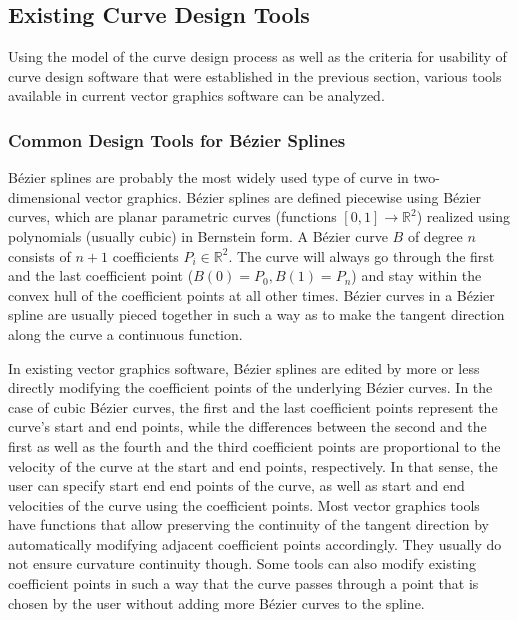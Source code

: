 \documentclass[a4paper]{article}
\begin{document}
		\subsection{Existing Curve Design Tools}

			Using the model of the curve design process as well as the criteria for usability of curve design software that were established in the previous section, various tools available in current vector graphics software can be analyzed.

			\subsubsection{Common Design Tools for Bézier Splines}

				Bézier splines are probably the most widely used type of curve in two-dimensional vector graphics. Bézier splines are defined piecewise using Bézier curves, which are planar parametric curves (functions \(\left[0,1\right] \rightarrow \mathbb{R}^2\)) realized using polynomials (usually cubic) in Bernstein form. A Bézier curve \(B\) of degree \(n\) consists of \(n + 1\) coefficients \(P_i \in \mathbb{R}^2\). The curve will always go through the first and the last coefficient point (\(B\left(0\right) = P_0, B\left(1\right) = P_n\)) and stay within the convex hull of the coefficient points at all other times. Bézier curves in a Bézier spline are usually pieced together in such a way as to make the tangent direction along the curve a continuous function.

				In existing vector graphics software, Bézier splines are edited by more or less directly modifying the coefficient points of the underlying Bézier curves. In the case of cubic Bézier curves, the first and the last coefficient points represent the curve's start and end points, while the differences between the second and the first as well as the fourth and the third coefficient points are proportional to the velocity of the curve at the start and end points, respectively. In that sense, the user can specify start end end points of the curve, as well as start and end velocities of the curve using the coefficient points. Most vector graphics tools have functions that allow preserving the continuity of the tangent direction by automatically modifying adjacent coefficient points accordingly. They usually do not ensure curvature continuity though. Some tools can also modify existing coefficient points in such a way that the curve passes through a point that is chosen by the user without adding more Bézier curves to the spline.
\end{document}
